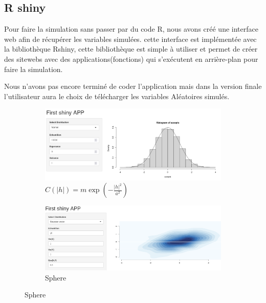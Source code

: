 \documentclass[10pt]{article} %
\begin{document}
\subsection{R shiny}

Pour faire la simulation sans passer par du code R, nous avons créé une interface web afin de récupérer les variables simulées.
cette interface est implémentée avec la bibliothèque Rshiny, cette bibliothèque est simple à utiliser et permet de créer des sitewebs
avec des applications(fonctions) qui s'exécutent en arrière-plan pour faire la simulation.

Nous n'avons pas encore terminé de coder l'application mais dans la version finale l'utilisateur aura le choix de télécharger les variables
Aléatoires simulés.

\begin{figure}[h!]
    \centering
    \begin{subfigure}[b]{0.48\textwidth}
        \centering
        \includegraphics[width=\textwidth]{media/apppic1.png}
        \caption{$C(|h|) = m \exp(-\frac{|h|^2}{a^2})$}
        \label{gauss plasma}
    \end{subfigure}
    \hfill
    \begin{subfigure}[b]{0.48\textwidth}
        \centering
        \includegraphics[width=\textwidth]{media/rshiny_gauss.png}
        \caption{Sphere}
        \label{fig:three sin x}
    \end{subfigure}
\end{figure}
\end{document}
